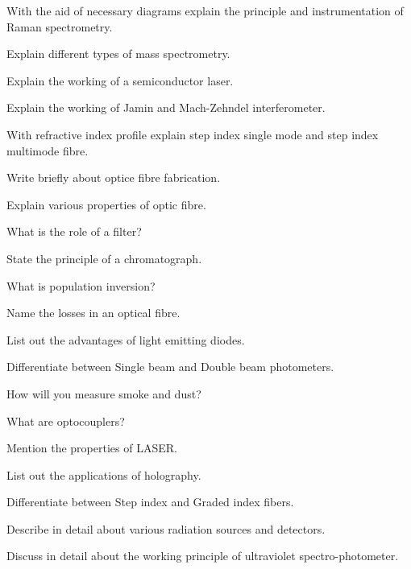 \newpage \again

\item \iitem With the aid of necessary diagrams explain the principle and
  instrumentation of Raman spectrometry.
\Or
\item Explain different types of mass spectrometry.
\ene

\item \iitem Explain the working of a semiconductor laser.
\Or
\item Explain the working of Jamin and Mach-Zehndel interferometer.
\ene

\item \iitem With refractive index profile explain step index single mode and step
  index multimode fibre.
\Or
\item \iitem Write briefly about optice fibre fabrication.
  \item Explain various properties of optic fibre.
  \ene
\ene
\markC
\ene

\newpage



\sub{\subj}

\maxtime

\partA

\iitem What is the role of a filter?
\item State the principle of a chromatograph.
\item What is population inversion?
\item Name the losses in an optical fibre.
\item List out the advantages of light emitting diodes.

\markA
\partB

\item Differentiate between Single beam and Double beam photometers.
\item How will you measure smoke and dust?
\item What are optocouplers?
\item Mention the properties of LASER.
\item List out the applications of holography.
\item Differentiate between Step index and Graded index fibers.

\markB
\partC

\item \iitem Describe in detail about various radiation sources and detectors.
\Or
\item Discuss in detail about the working principle of ultraviolet
  spectro-photometer.
\ene


